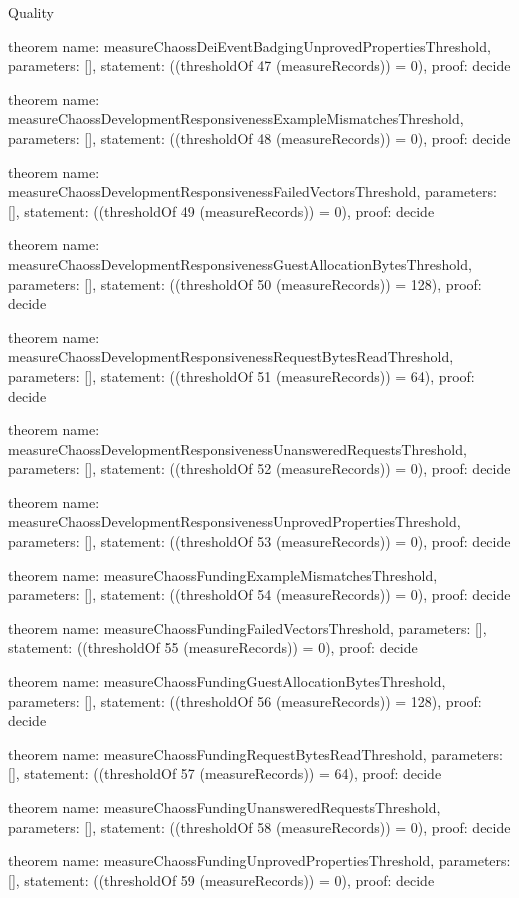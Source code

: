 \begin{lexlean}{Quality}
\begin{semanticmodule}
theorem{
  name: measureChaossDeiEventBadgingUnprovedPropertiesThreshold,
  parameters: [],
  statement: ((thresholdOf 47 (measureRecords)) = 0),
  proof: decide{}
}

theorem{
  name: measureChaossDevelopmentResponsivenessExampleMismatchesThreshold,
  parameters: [],
  statement: ((thresholdOf 48 (measureRecords)) = 0),
  proof: decide{}
}

theorem{
  name: measureChaossDevelopmentResponsivenessFailedVectorsThreshold,
  parameters: [],
  statement: ((thresholdOf 49 (measureRecords)) = 0),
  proof: decide{}
}

theorem{
  name: measureChaossDevelopmentResponsivenessGuestAllocationBytesThreshold,
  parameters: [],
  statement: ((thresholdOf 50 (measureRecords)) = 128),
  proof: decide{}
}

theorem{
  name: measureChaossDevelopmentResponsivenessRequestBytesReadThreshold,
  parameters: [],
  statement: ((thresholdOf 51 (measureRecords)) = 64),
  proof: decide{}
}

theorem{
  name: measureChaossDevelopmentResponsivenessUnansweredRequestsThreshold,
  parameters: [],
  statement: ((thresholdOf 52 (measureRecords)) = 0),
  proof: decide{}
}

theorem{
  name: measureChaossDevelopmentResponsivenessUnprovedPropertiesThreshold,
  parameters: [],
  statement: ((thresholdOf 53 (measureRecords)) = 0),
  proof: decide{}
}

theorem{
  name: measureChaossFundingExampleMismatchesThreshold,
  parameters: [],
  statement: ((thresholdOf 54 (measureRecords)) = 0),
  proof: decide{}
}

theorem{
  name: measureChaossFundingFailedVectorsThreshold,
  parameters: [],
  statement: ((thresholdOf 55 (measureRecords)) = 0),
  proof: decide{}
}

theorem{
  name: measureChaossFundingGuestAllocationBytesThreshold,
  parameters: [],
  statement: ((thresholdOf 56 (measureRecords)) = 128),
  proof: decide{}
}

theorem{
  name: measureChaossFundingRequestBytesReadThreshold,
  parameters: [],
  statement: ((thresholdOf 57 (measureRecords)) = 64),
  proof: decide{}
}

theorem{
  name: measureChaossFundingUnansweredRequestsThreshold,
  parameters: [],
  statement: ((thresholdOf 58 (measureRecords)) = 0),
  proof: decide{}
}

theorem{
  name: measureChaossFundingUnprovedPropertiesThreshold,
  parameters: [],
  statement: ((thresholdOf 59 (measureRecords)) = 0),
  proof: decide{}
}


\end{semanticmodule}
\end{lexlean}

